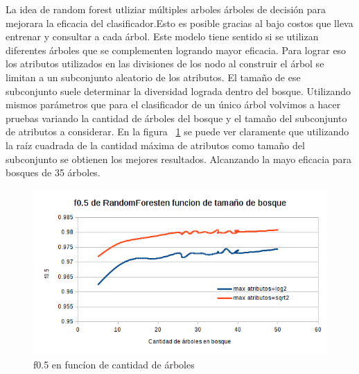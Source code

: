
La idea de random forest utliziar múltiples arboles árboles de decisión para mejorara la eficacia del clasificador.Esto es posible gracias al bajo costos que lleva entrenar y consultar a cada árbol. Este modelo tiene sentido si se utilizan  diferentes árboles que se complementen logrando mayor eficacia.  Para lograr eso los atributos utilizados en las divisiones de los nodo al construir el árbol se limitan a un subconjunto aleatorio de los atributos. El tamaño de ese subconjunto suele determinar la diversidad lograda dentro del bosque. Utilizando mismos parámetros que para el clasificador de un único árbol volvimos a hacer pruebas variando la cantidad de árboles del bosque y el tamaño del subconjunto de atributos a considerar. En la figura ~\ref{fig:forest_f05_en_funcion_de_cantidad_de_arboles} se puede ver claramente que utilizando la raíz cuadrada de la cantidad máxima de atributos como tamaño del subconjunto se obtienen los mejores resultados. Alcanzando la mayo eficacia para bosques de 35 árboles. 


\begin{figure}[H]
    \centering
        \includegraphics[width=\textwidth]{plots/forest_f05_en_funcion_de_cantidad_de_arboles.png}
        \caption{f0.5 en funcíon de cantidad de árboles}
        \label{fig:forest_f05_en_funcion_de_cantidad_de_arboles}
\end{figure}

